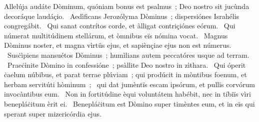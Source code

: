 { Allelúja}
{%
audáte Dòminum, quóniam bonus est psalmus~; Deo nostro sit jucùnda decoráque laudáçio. 
~Aedìficans Jerozólyma Dòminus~; dispersiónes Israhélis congregábit. 
~Qui sanat contrítos corde, et àlligat contriçiónes eórum. 
~Qui númerat multitúdinem stellárum, et òmnibus eïs nómina vocat. 
~Magnus Dòminus noster, et magna vìrtüs ejus, et sapiènçiae ejus non est númerus. 
~Susċìpiens mansuétos Dòminus~; humìlians autem peccatóres usque ad terram. 
~Praeċìnite Dòmino in confessióne~; psàllite Deo nostro in zìthara. 
~Qui óperit ċaelum núbibus, et parat terrae plúviam~; qui prodúcit in mòntibus foenum, et herbam servitúti hòminum~; 
~qui dat jumèntïs escam ipsórum, et pullïs corvórum invocàntibus eum. 
~Non in fortitúdine èqui voluntátem habébit, nec in tíbiïs vìri benepláċitum èrit ei. 
~Benepláċitum est Dòmino super timèntes eum, et in eïs qui sperant super mizericórdia ejus. 
}
